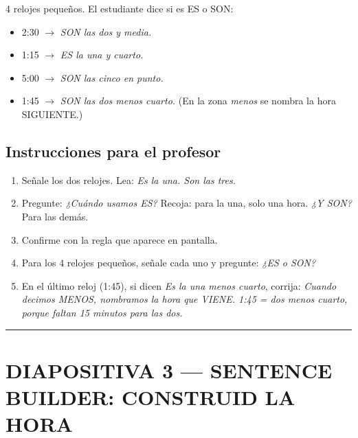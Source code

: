 \documentclass[a4paper,11pt]{article}
\begin{document}
\vspace{0.3cm}

4 relojes pequeños. El estudiante dice si es ES o SON:
\begin{itemize}[leftmargin=2cm, itemsep=3pt]
\item 2:30 $\rightarrow$ \textit{SON las dos y media.}
\item 1:15 $\rightarrow$ \textit{ES la una y cuarto.}
\item 5:00 $\rightarrow$ \textit{SON las cinco en punto.}
\item 1:45 $\rightarrow$ \textit{SON las dos menos cuarto.} (En la zona \textit{menos} se nombra la hora SIGUIENTE.)
\end{itemize}

\vspace{0.5cm}

\subsection*{Instrucciones para el profesor}

\begin{enumerate}[leftmargin=1.5cm, itemsep=4pt]
\item Señale los dos relojes. Lea: \textit{Es la una. Son las tres.}
\item Pregunte: \textit{¿Cuándo usamos ES?} Recoja: para la una, solo una hora. \textit{¿Y SON?} Para las demás.
\item Confirme con la regla que aparece en pantalla.
\item Para los 4 relojes pequeños, señale cada uno y pregunte: \textit{¿ES o SON?}
\item En el último reloj (1:45), si dicen \textit{Es la una menos cuarto}, corrija: \textit{Cuando decimos MENOS, nombramos la hora que VIENE. 1:45 = dos menos cuarto, porque faltan 15 minutos para las dos.}
\end{enumerate}

\newpage


\noindent\textcolor{violeta}{\rule{\linewidth}{2.5pt}}

\section*{DIAPOSITIVA 3 — SENTENCE BUILDER: CONSTRUID LA HORA}
\end{document}
